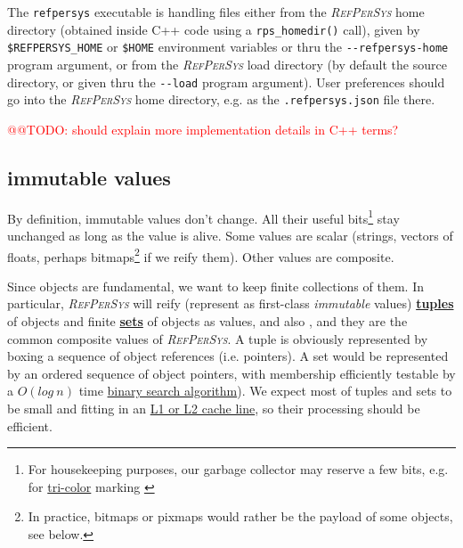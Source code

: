 \documentclass[11pt,a4paper,svgnames]{article}
\newcommand{\RefPerSys}{{\textit{\textsc{RefPerSys}}}}
\begin{document}
The \texttt{refpersys} executable is handling files either from the
{\RefPerSys} home directory (obtained inside C++ code using
a \texttt{rps\_homedir()} call), given by \texttt{\$REFPERSYS\_HOME} or
\texttt{\$HOME} environment variables or thru the
\texttt{-{-}refpersys-home} program argument, or from the {\RefPerSys}
load directory (by default the source directory, or given thru the
\texttt{-{-}load} program argument). User preferences should go into the
       {\RefPerSys} home directory, e.g. as the
       \texttt{.refpersys.json} file there.

\textcolor{red}{@@TODO: should explain more implementation details in C++ terms?}


\medskip

\subsection{immutable values}
\label{subsec:immutable-values}

By definition, immutable values don't change. All their useful
bits\footnote{For housekeeping purposes, our garbage collector may
reserve a few bits, e.g. for
\href{https://www.memorymanagement.org/glossary/t.html}{tri-color}
marking \cite{wilson:1992:uniprocessorgc}} stay unchanged as long as
the value is alive. Some values are scalar (strings, vectors of
floats, perhaps bitmaps\footnote{In practice, bitmaps or pixmaps would
rather be the payload of some objects, see below.} if we reify
them). Other values are composite.

Since objects are fundamental, we want to keep finite collections of
them. In particular, {\RefPerSys} will reify (represent as first-class
\emph{immutable} values)
\href{https://en.wikipedia.org/wiki/Tuple}{\textbf{tuples}}
 of objects and finite
\href{https://en.wikipedia.org/wiki/Set_(abstract_data_type)}{\textbf{sets}}
of objects as values, and also , and they are the common composite
values of \RefPerSys. A tuple is obviously represented by boxing a
sequence of object references (i.e. pointers). A set would be
represented by an ordered sequence of object pointers, with membership
efficiently testable by a
\href{https://en.wikipedia.org/wiki/Time\_complexity}{$O(log~ n)$}
time
\href{https://en.wikipedia.org/wiki/Binary_search_algorithm}{binary
  search algorithm}). We expect most of tuples and sets to be small
and fitting in an
\href{https://en.wikipedia.org/wiki/Cache\_hierarchy}{L1 or L2 cache
  line}, so their processing should be efficient.
\end{document}
